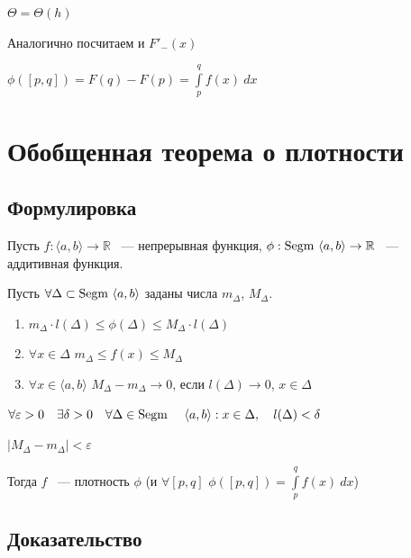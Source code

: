 \documentclass{article}
\begin{document}
            $\Theta = \Theta(h)$
            
            Аналогично посчитаем и $F'_-(x)$
            
            $\phi([p, q]) = F(q) - F(p) = \int\limits^q_p f(x) \ dx$
            
    \newpage
    
    \section{Обобщенная теорема о плотности}
    
        \subsection{Формулировка}
            
            Пусть $f : \langle a, b \rangle \rightarrow \mathbb{R}$ ~--- непрерывная функция, $\phi : \Segm \langle a, b \rangle \rightarrow \mathbb{R}$ ~--- аддитивная функция.
        
            Пусть $\forall \Delta \subset \Segm \langle a, b \rangle$ заданы числа $m_{\Delta}$, $M_{\Delta}$.
        
            \begin{enumerate}
        
                \item $m_{\Delta} \cdot l(\Delta) \leq \phi(\Delta) \leq M_{\Delta} \cdot l(\Delta)$
            
                \item $\forall x \in \Delta$ $m_{\Delta} \leq f(x) \leq M_{\Delta}$
            
                \item $\forall x \in \langle a, b \rangle$ $M_{\Delta} - m_{\Delta} \rightarrow 0$, если $l(\Delta) \rightarrow 0$, $x \in \Delta$
            
            \end{enumerate}
        
            $\forall \varepsilon > 0 \ \ \ \exists \delta > 0 \ \ \ \forall \Delta \in \Segm \ \ \ \langle a, b \rangle : x \in \Delta, \ \ \ l(\Delta) < \delta$
            
            $\left| M_{\Delta} - m_{\Delta} \right| < \varepsilon$
        
            Тогда $f$ ~--- плотность $\phi$ (и $\forall [p, q]$ $\phi([p, q]) = \int\limits^q_p f(x) \ dx$)
        
        \subsection{Доказательство}
        
\end{document}
